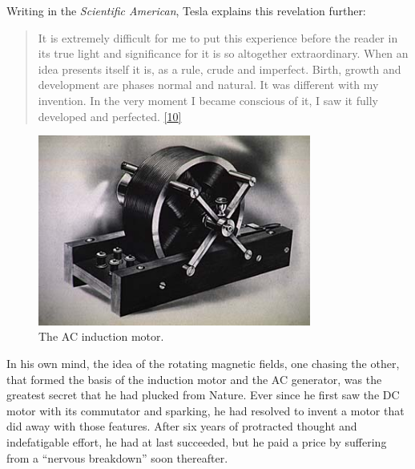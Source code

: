 \documentclass[
  12pt,
  british,
  a4paper,
  rgb,
  dvipsnames,
  svgnames,
  hyphens]{article}
\begin{document}
Writing in the \emph{Scientific American}, Tesla explains this
revelation further:

\begin{quote}
It is extremely difficult for me to put this experience before the
reader in its true light and significance for it is so altogether
extraordinary. When an idea presents itself it is, as a rule, crude and
imperfect. Birth, growth and development are phases normal and natural.
It was different with my invention. In the very moment I became
conscious of it, I saw it fully developed and perfected.
\protect\hyperlink{ref-tesla-personal}{{[}10{]}}
\end{quote}

\begin{figure}
\hypertarget{fig:ac-motor}{%
\centering
\includegraphics[width=0.8\textwidth,height=\textheight]{images/acmot_main02.jpg}
\caption[The AC induction motor.]{The AC induction
motor.\footnotemark{}}\label{fig:ac-motor}
}
\end{figure}

In his own mind, the idea of the rotating magnetic fields, one chasing
the other, that formed the basis of the induction motor and the AC
generator, was the greatest secret that he had plucked from Nature. Ever
since he first saw the DC motor with its commutator and sparking, he had
resolved to invent a motor that did away with those features. After six
years of protracted thought and indefatigable effort, he had at last
succeeded, but he paid a price by suffering from a ``nervous breakdown''
soon thereafter.
\end{document}
